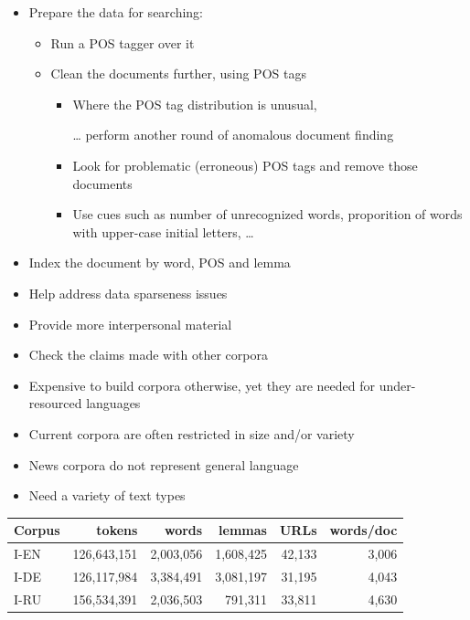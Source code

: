 \documentclass[a4paper,landscape,headrule,footrule,xetex]{foils}
\begin{document}
\begin{itemize}
\item Prepare the  data  for searching:
  \begin{itemize}
  \item Run a POS tagger over it
  \item Clean the documents further, using POS tags
    \begin{itemize}
    \item Where the POS tag distribution is unusual,
    \item[\ldots] perform another round of anomalous document
finding
\item Look for problematic (erroneous) POS tags and
remove those documents
\item Use cues such as number of unrecognized words,
proporition of words with upper-case initial letters, \ldots
\end{itemize}
\end{itemize}
\item Index the document by word, POS and lemma
\end{itemize}


\begin{itemize}
\item Help address data sparseness issues
\item Provide more interpersonal material
\item Check the claims made with other corpora
\item Expensive to build corpora otherwise, yet they are
needed for under-resourced languages
\item Current corpora are often restricted in size and/or
variety
\item News corpora do not represent general language
\item Need a variety of text types
\end{itemize}


\begin{tabular}{lrrrrr}
Corpus & tokens &  words &  lemmas &  URLs & words/doc \\
\hline
I-EN & 126,643,151 & 2,003,056 & 1,608,425 & 42,133 & 3,006 \\
I-DE & 126,117,984 & 3,384,491 & 3,081,197 & 31,195 & 4,043 \\
I-RU & 156,534,391 & 2,036,503 & 791,311 & 33,811 & 4,630
\end{tabular}
\end{document}
